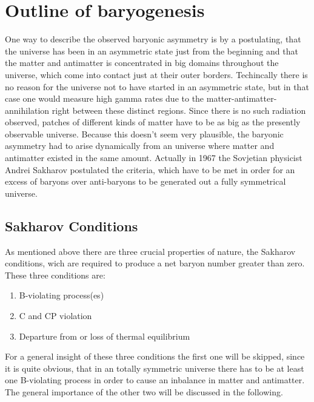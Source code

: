 \chapter{Outline of baryogenesis}
One way to describe the observed baryonic asymmetry is by a postulating, that the universe has been in an asymmetric state just from the beginning and that the matter and antimatter is concentrated in big domains throughout the universe, which come into contact just at their outer borders. Techincally there is no reason for the universe not to have started in an asymmetric state, but in that case one would measure high gamma rates due to the matter-antimatter-annihilation right between these distinct regions. \newline
Since there is no such radiation observed, patches of different kinds of matter have to be as big as the presently observable universe. Because this doesn't seem very plausible, the baryonic asymmetry had to arise dynamically from an universe where matter and antimatter existed in the same amount. \newline
Actually in 1967 the Sovjetian physicist Andrei Sakharov postulated the criteria, which have to be met in order for an excess of baryons over anti-baryons to be generated out a fully symmetrical universe.
\section{Sakharov Conditions}
As mentioned above there are three crucial properties of nature, the Sakharov conditions, wich are required to produce a net baryon number greater than zero. These three conditions are:
\begin{enumerate}
	\item B-violating process(es)
	\item C and CP violation
	\item Departure from or loss of thermal equilibrium
\end{enumerate}
For a general insight of these three conditions the first one will be skipped, since it is quite obvious, that in an totally symmetric universe there has to be at least one B-violating process in order to cause an inbalance in matter and antimatter. \newline
The general importance of the other two will be discussed in the following.
